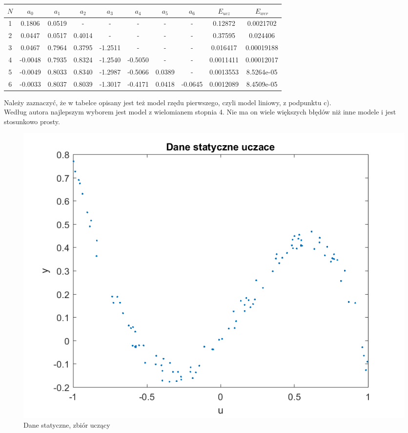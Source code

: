 \documentclass{article}
\begin{document}
\begin{tabular}{|c|c|c|c|c|c|c|c|c|c|}
\hline 
$N$ & $a_0$ & $a_1$ & $a_2$ & $a_3$ & $a_4$ & $a_5$ & $a_6$ & $E_{ucz}$ & $E_{wer}$ \\ 
\hline 
1 & 0.1806 & 0.0519 & - & - & - & - & - & 0.12872 & 0.0021702 \\ 
\hline 
2 & 0.0447 & 0.0517 & 0.4014 & - & - & - & - & 0.37595 & 0.024406 \\ 
\hline 
3 & 0.0467 &  0.7964&0.3795  &-1.2511  & - & - &-  &0.016417  &0.00019188  \\ 
\hline 
4 & -0.0048 & 0.7935 & 0.8324 & -1.2540  & -0.5050 & - & - & 0.0011411 & 0.00012017 \\ 
\hline 
5 &-0.0049  & 0.8033 & 0.8340 &   -1.2987&  -0.5066& 0.0389 & - & 0.0013553 & 8.5264e-05 \\ 
\hline 
6 & -0.0033 &  0.8037&  0.8039& -1.3017 &-0.4171  &0.0418  & -0.0645 & 0.0012089 & 8.4509e-05 \\ 
\hline 

\end{tabular} 
Należy zaznaczyć, że w tabelce opisany jest też model rzędu pierwszego, czyli model liniowy, z podpunktu c).\\
Według autora najlepszym wyborem jest model z wielomianem stopnia 4. Nie ma on wiele większych błędów niż inne modele i jest stosunkowo prosty.
\begin{figure}
\centering
\includegraphics[width=0.95\linewidth]{../dane_statyczne/dane_statyczne_uczace}
\caption{Dane statyczne, zbiór uczący}
\label{fig:danestatyczneuczace}
\end{figure}
\end{document}
